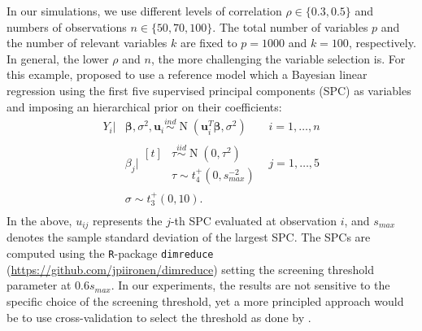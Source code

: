 \documentclass[a4]{article}
\theoremstyle{definition}
\DeclareMathOperator{\N}{N}
\begin{document}
In our simulations, we use different levels of correlation 
$\rho\in\{0.3,0.5\}$ and numbers of
observations $n\in\{50,70,100\}$. The total number of variables $p$
and the number of relevant variables $k$ are fixed to $p = 1000$ and
$k = 100$, respectively. In general, the lower $\rho$ and $n$, the
more challenging the variable selection is. For this example, \citet{paper:projpred} proposed to
use a reference model which a Bayesian linear regression using the first five
supervised principal components (SPC) as variables and imposing an hierarchical prior on
their coefficients:
\begin{equation}
\label{eq:ref_mod}
\begin{aligned}
    Y_{i}|&\boldsymbol{\beta},\sigma^{2},\boldsymbol{u}_{i} \overset{ind}{\sim} \N(\boldsymbol{u}_{i}^{T}\boldsymbol{\beta},\sigma^{2}) \quad &i=1,\ldots,n \\
    &\beta_{j}|\!\begin{aligned}[t] &\tau \overset{iid}{\sim} \N(0,\tau^{2})\\
    &\tau \sim t_{4}^{+}(0,s_{max}^{-2}) 
    \end{aligned} &j=1,\ldots,5 \\ 
    &\sigma \sim t_{3}^{+}(0,10). \\
\end{aligned}
\end{equation}
In the above, $u_{ij}$ represents the $j$-th SPC evaluated at
observation $i$, and $s_{max}$ denotes the sample standard deviation
of the largest SPC.  The SPCs are computed using the
\texttt{R}-package \texttt{dimreduce} (\url{https://github.com/jpiironen/dimreduce}) setting the screening threshold
parameter at $0.6s_{max}$.  In our experiments, the results are not
sensitive to the specific choice of the screening threshold, yet a more
principled approach would be to use cross-validation to select the
threshold as done by \citet{paper:projpred}.
\end{document}
